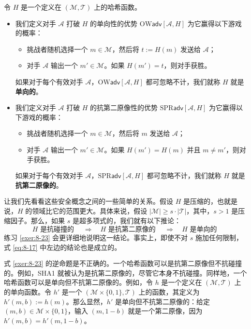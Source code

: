 \begin{definition}\label{def:8-6}
令 $H$ 是一个定义在 $(\mathcal{M},\mathcal{T})$ 上的哈希函数。
\begin{itemize}
	\item 我们定义对手 $\mathcal{A}$ 打破 $H$ 的单向性的优势 $\mathrm{OW}\mathsf{adv}[\mathcal{A},H]$ 为它赢得以下游戏的概率：
	\begin{itemize}
		\item 挑战者随机选择一个 $m\in\mathcal{M}$，然后将 $t:=H(m)$ 发送给 $\mathcal{A}$；
		\item 对手 $\mathcal{A}$ 输出一个 $m'\in\mathcal{M}$。如果 $H(m')=t$，则对手获胜。
	\end{itemize}
	如果对于每个有效对手 $\mathcal{A}$，$\mathrm{OW}\mathsf{adv}[\mathcal{A},H]$ 都可忽略不计，我们就称 $H$ 就是\textbf{单向的}。
	\item 我们定义对手 $\mathcal{A}$ 打破 $H$ 的抗第二原像性的优势 $\mathrm{SPR}\mathsf{adv}[\mathcal{A},H]$ 为它赢得以下游戏的概率：
	\begin{itemize}
		\item 挑战者随机选择一个 $m\in\mathcal{M}$，然后将 $m$ 发送给 $\mathcal{A}$；
		\item 对手 $\mathcal{A}$ 输出一个 $m'\in\mathcal{M}$。如果 $H(m')=H(m)$ 并且 $m\neq m'$，则对手获胜。
	\end{itemize}
	如果对于每个有效对手 $\mathcal{A}$，$\mathrm{SPR}\mathsf{adv}[\mathcal{A},H]$ 都可忽略不计，我们就称 $H$ 就是\textbf{抗第二原像的}。
\end{itemize}
\end{definition}

让我们先看看这些安全概念之间的一些简单的关系。假设 $H$ 是压缩的，也就是说，$H$ 的领域比它的范围更大。具体来说，假设 $|\mathcal{M}|\geq s\cdot|\mathcal{T}|$，其中，$s>1$ 是压缩因子。那么，如果 $s$ 是超多项式的，我们就有以下推论：
\begin{equation}\label{eq:8-17}
H \text{ 是抗碰撞的 }
\quad\Longrightarrow\quad
H \text{ 是抗第二原像的 } 
\quad\Longrightarrow\quad
H \text{ 是单向的 }
\end{equation}
练习 \ref{exer:8-23} 会更详细地说明这一结论。事实上，即使不对 $s$ 施加任何限制，式 \ref{eq:8-17} 中左边的结论也是成立的。

式 \ref{exer:8-23} 的逆命题是不正确的。一个哈希函数可以是抗第二原像但不抗碰撞的。例如，SHA1 就被认为是抗第二原像的，尽管它本身不抗碰撞。同样地，一个哈希函数可以是单向但不抗第二原像的。例如，令 $h$ 是一个定义在 $(\mathcal{M},\mathcal{T})$ 上的单向函数。令 $h'$ 是一个 $(\mathcal{M}\times\{0,1\},\mathcal{T})$ 上的函数，其定义为 $h'(m,b):=h(m)$。那么显然，$h'$ 是单向但不抗第二原像的：给定 $(m,b)\in\mathcal{M}\times\{0,1\}$，输入 $(m,1-b)$ 就是一个第二原像，因为 $h'(m,b)=h'(m,1-b)$。

